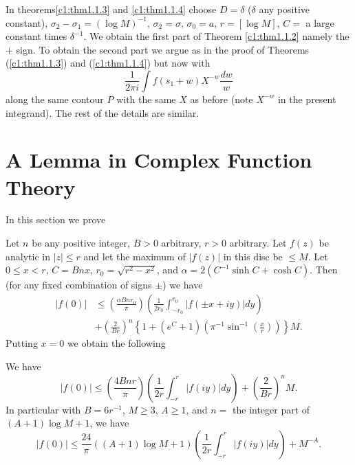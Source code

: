 \medskip
{} In theorems\pageoriginale  \ref{c1:thm1.1.3} and  \ref{c1:thm1.1.4} choose $D = \delta$ ($\delta$ any positive constant), $\sigma_2 - \sigma_1 = (\log M)^{-1}$, $\sigma_2 = \sigma$, $\sigma_0 = a$, $r = [\log M]$, $C =$ a large constant  times $\delta^{-1}$. We obtain the first part of Theorem  \ref{c1:thm1.1.2} namely the $+$ sign. To obtain the second part we argue as in the proof of Theorems (\ref{c1:thm1.1.3}) and (\ref{c1:thm1.1.4}) but now with
$$
\frac{1}{2\pi i} \int f(s_1 + w) X^{-w} \frac{dw}{w}
$$
along the same contour $P$ with the same $X$ as before (note $X^{-w}$ in the present integrand). The rest of the details are similar.


\section{A Lemma in Complex Function Theory}\label{c1:sec1.2}
In this section we prove

\begin{theorem}\label{c1:thm1.2.1}
Let $n$ be any positive integer, $B > 0$ arbitrary, $r > 0$ arbitrary. Let $f(z)$ be analytic in $|z| \leq r$ and let the maximum of $|f(z)|$ in this disc be $\leq M$. Let $0 \leq x < r$, $C= Bnx$, $r_0 = \sqrt{r^2-x^2}$, and $\alpha = 2(C^{-1} \sinh C+ \cosh C)$. Then (for any fixed combination of signs $\pm$) we have
\begin{align*}
 |f(0)| &  \leq \left(\frac{\alpha B n r_0}{\pi}  \right) \left(\frac{1}{2r_0} \int^{r_0}_{-r_0} |f(\pm x + iy)| dy \right)\\
& + \left(\frac{2}{Br} \right)^n \left\{ 1+ (e^C+1) (\pi^{-1} \sin^{-1} \left(\frac{x}{r} \right))\right\} M. \tag{1.2.1}\label{c1:eq1.2.1}
\end{align*}
Putting $x = 0$ we obtain the following
\end{theorem}

\begin{coro*}
We have 
\begin{equation*}
|f(0)| \leq \left( \frac{4Bnr}{\pi}\right) \left(\frac{1}{2r} \int^r_{-r} |f(iy)| dy \right) + \left(\frac{2}{Br} \right)^n M. \tag{1.2.2}\label{c1:eq1.2.2}
\end{equation*}
In particular with $B = 6 r^{-1}$, $M \geq 3$, $A \geq 1$, and $n =$ the integer part of $(A+1) \log M+1$, we have
\begin{equation*}
|f(0)| \leq \frac{24}{\pi} ((A+1) \log M+1) \left( \frac{1}{2r} \int^r_{-r} |f(iy)| dy\right) + M^{-A} . \tag{1.2.3}\label{c1:eq1.2.3}
\end{equation*}
\end{coro*}

